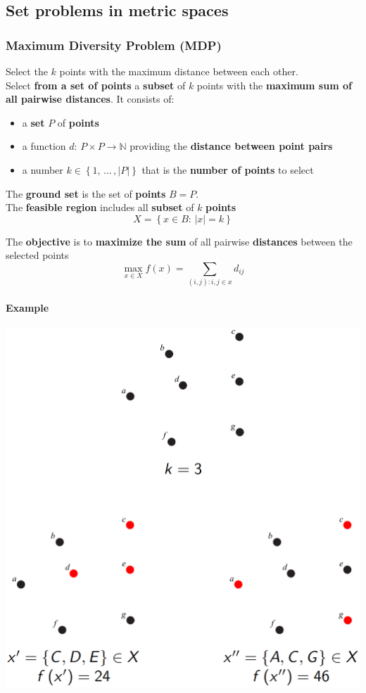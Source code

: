 \documentclass[11pt]{article}
\begin{document}
	\newpage
	
	\subsection{Set problems in metric spaces}
	\subsubsection{Maximum Diversity Problem (MDP)}
	Select the $k$ points with the maximum distance between each other.\\ 
	Select \textbf{from a set of points} a \textbf{subset} of $k$ points with the\textbf{ maximum sum of all pairwise distances}. It consists of: 
	\begin{itemize}
		\item a \textbf{set} $P$ of \textbf{points}
		\item a function $d: \, P \times P \rightarrow \mathbb{N}$ providing the \textbf{distance between point pairs}
		\item a number $k \in \left\{1, \, ... \, , |P| \right\}$ that is the \textbf{number of points} to select
	\end{itemize}
	
	The \textbf{ground set} is the set of \textbf{points} $B = P$.\\
	
	The \textbf{feasible region} includes all \textbf{subset} of $k$ \textbf{points} 
	$$ X = \left\{x \in B : \, |x| = k \right\}$$
	
	The \textbf{objective} is to \textbf{maximize the sum} of all pairwise \textbf{distances} between the selected points
	$$ \max_{x \in X} f(x) = \sum_{(i,j):i,j \in x} d_{ij}$$ 
	
	\paragraph{Example}
	\begin{center}
		\includegraphics[width=0.6\columnwidth]{img/MDP1}
	\end{center}
	
\end{document}
